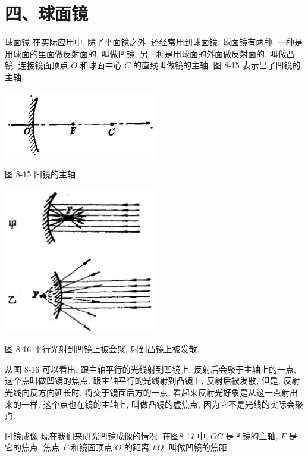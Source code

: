 \documentclass[10pt]{article}
\begin{document}
\section*{四、球面镜}

球面镜 在实际应用中, 除了平面镜之外, 还经常用到球面镜. 球面镜有两种: 一种是用球面的里面做反射面的, 叫做凹镜; 另一种是用球面的外面做反射面的, 叫做凸镜. 连接镜面顶点 \(O\) 和球面中心 \(C\) 的直线叫做镜的主轴. 图 8-15 表示出了凹镜的主轴.

\begin{center}
\includegraphics[max width=0.5\textwidth]{images/01913056-1f15-74d8-9184-9aab52c9d66b_254_385703.jpg}
\end{center}

图 8-15 凹镜的主轴

\begin{center}
\includegraphics[max width=0.5\textwidth]{images/01913056-1f15-74d8-9184-9aab52c9d66b_254_467105.jpg}
\end{center}

图 8-16 平行光射到凹镜上被会聚, 射到凸镜上被发散.

从图 8-16 可以看出, 跟主轴平行的光线射到凹镜上, 反射后会聚于主轴上的一点, 这个点叫做凹镜的焦点. 跟主轴平行的光线射到凸镜上, 反射后被发散, 但是, 反射光线向反方向延长时, 将交于镜面后方的一点, 看起来反射光好象是从这一点射出来的一样. 这个点也在镜的主轴上, 叫做凸镜的虚焦点, 因为它不是光线的实际会聚点.

凹镜成像 现在我们来研究凹镜成像的情况. 在图8-17 中, \({OC}\) 是凹镜的主轴, \(F\) 是它的焦点. 焦点 \(F\) 和镜面顶点 \(O\) 的距离 \({FO}\) ,叫做凹镜的焦距.
\end{document}
